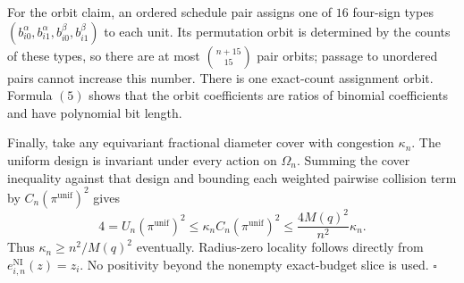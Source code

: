 For the orbit claim, an ordered schedule pair assigns one of \(16\) four-sign types \((b_{i0}^\alpha,b_{i1}^\alpha,b_{i0}^\beta,b_{i1}^\beta)\) to each unit. Its permutation orbit is determined by the counts of these types, so there are at most \(\binom{n+15}{15}\) pair orbits; passage to unordered pairs cannot increase this number. There is one exact-count assignment orbit. Formula \((5)\) shows that the orbit coefficients are ratios of binomial coefficients and have polynomial bit length.

Finally, take any equivariant fractional diameter cover with congestion \(\kappa_n\). The uniform design is invariant under every action on \(\Omega_n\). Summing the cover inequality against that design and bounding each weighted pairwise collision term by \(C_n(\pi^{\mathrm{unif}})^2\) gives
\[
 4=U_n(\pi^{\mathrm{unif}})^2
 \le\kappa_n C_n(\pi^{\mathrm{unif}})^2
 \le\frac{4M(q)^2}{n^2}\kappa_n. \tag{10}
\]
Thus \(\kappa_n\ge n^2/M(q)^2\) eventually. Radius-zero locality follows directly from \(e^{\mathrm{NI}}_{i,n}(z)=z_i\). No positivity beyond the nonempty exact-budget slice is used. \(\square\)